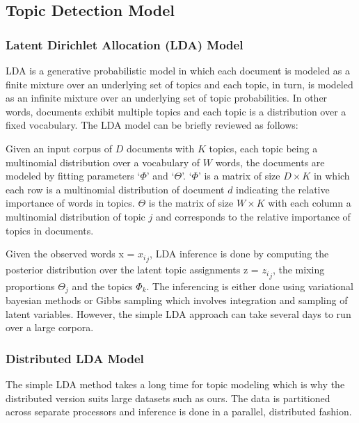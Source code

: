 \subsection{Topic Detection Model}
\label{topic detection:model}

\subsubsection{Latent Dirichlet Allocation (LDA) Model}

LDA is a generative probabilistic model in which each document is modeled as a finite mixture over an underlying set of topics and each topic, in turn, is modeled as an infinite mixture over an underlying set of topic probabilities\cite{blei2003latent}. In other words, documents exhibit multiple topics and each topic is a distribution over a fixed vocabulary.
The LDA model can be briefly reviewed as follows:


Given an input corpus of $D$ documents with $K$ topics, each topic being a multinomial distribution over a vocabulary of  $W$ words, the documents are modeled by fitting parameters `${\Phi}$' and `${\Theta}$'. `${\Phi}$' is a matrix of size $D \times K$ in which each row is a multinomial distribution of document $d$  indicating the relative importance of words in topics. ${\Theta}$ is the matrix of size $W \times K$ with each column a multinomial distribution of topic $j$ and corresponds to the relative importance of topics in documents.

Given the observed words x = ${x_i}_j$, LDA inference is done by computing the
posterior distribution over the latent topic assignments z = ${z_i}_j$, the mixing proportions ${\Theta_j}$  and the
topics ${\Phi_k}$.  The inferencing is either done using variational bayesian methods or Gibbs sampling which involves integration and sampling of latent variables.
However, the simple LDA approach can take several days to run over a large corpora.


\subsubsection{Distributed LDA Model}
 The simple LDA method takes a long time for topic modeling which is why the distributed version suits large datasets such as ours. The data is partitioned across separate processors and inference is done in a parallel, distributed fashion. 

